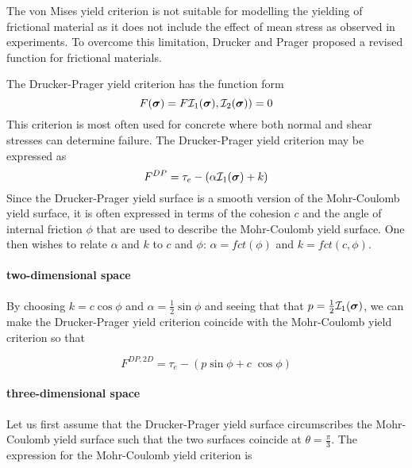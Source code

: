 The von Mises yield criterion is not suitable for modelling the yielding of frictional material 
as it does not include the effect of mean stress as observed in experiments. To overcome this 
limitation, Drucker and Prager \cite{drpr52} proposed a revised function for frictional materials.

The Drucker-Prager yield criterion has the function form
\begin{equation}
F({\bm \sigma})=F {\cal I}_1({\bm \sigma}), {\cal I}_2({\bm \sigma}) ) = 0 
\end{equation}
This criterion is most often used for concrete where both normal and shear stresses 
can determine failure. The Drucker-Prager yield criterion may be expressed as
\begin{equation}
F^{DP}=\tau_e - (\alpha {\cal I}_1({\bm \sigma}) + k) \label{dpcriterion} 
\end{equation}
Since the Drucker-Prager yield surface is a smooth version of the Mohr-Coulomb yield surface, it 
is often expressed in terms of the cohesion $c$ and the angle of internal friction $\phi$ that are used 
to describe the Mohr-Coulomb yield surface. One then wishes to relate $\alpha$ and $k$ to $c$ and $\phi$:
$\alpha= fct(\phi)$ and $k= fct(c,\phi) $.

\paragraph{two-dimensional space}

By choosing $k=c \cos \phi $ and $\alpha=\frac{1}{2}\sin \phi$ and seeing that that $p=\frac{1}{2} {\cal I}_1({\bm \sigma})$, we can make the Drucker-Prager yield criterion coincide with the Mohr-Coulomb yield criterion
so that 
\begin{mdframed}[backgroundcolor=blue!5]
\begin{equation}
F^{DP,2D} = \tau_e - (p \sin \phi + c \; \cos \phi) 
\end{equation}
\end{mdframed}


\paragraph{three-dimensional space}

Let us first assume that the Drucker-Prager yield surface circumscribes the Mohr-Coulomb yield surface such that the two surfaces coincide at $\theta=\tfrac{\pi}{3}$. 
The expression for the Mohr-Coulomb yield criterion is

